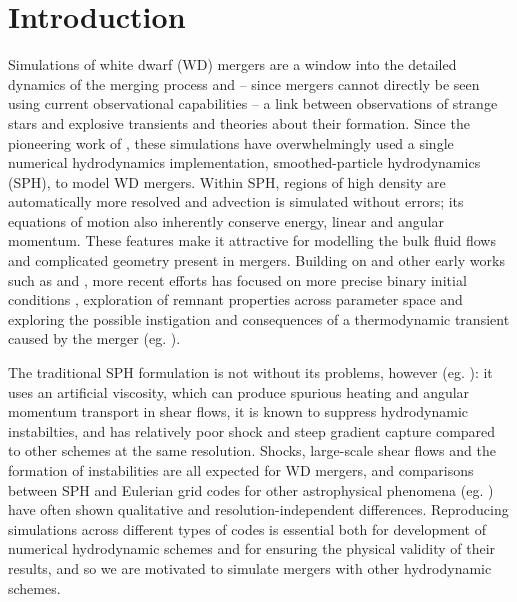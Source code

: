 \section{Introduction}
\label{sec:c3_intro}


Simulations of white dwarf (WD) mergers are a window into the detailed dynamics of the merging process and -- since mergers cannot directly be seen using current observational capabilities -- a link between observations of strange stars and explosive transients and theories about their formation.  Since the pioneering work of \cite{benz+90}, these simulations have overwhelmingly used a single numerical hydrodynamics implementation, smoothed-particle hydrodynamics (SPH), to model WD mergers.  Within SPH, regions of high density are automatically more resolved and advection is simulated without errors; its equations of motion also inherently conserve energy, linear and angular momentum.  These features make it attractive for modelling the bulk fluid flows and complicated geometry present in mergers.  Building on \citeauthor{benz+90} and other early works such as \cite{segrcm97} and \cite{guerig04}, more recent efforts has focused on more precise binary initial conditions \citep{dan+11}, exploration of remnant properties across parameter space \citep{loreig09, rask+12, zhu+13, dan+14} and exploring the possible instigation and consequences of a thermodynamic transient caused by the merger (eg. \citealt{pakm+10, dan+12, pakm+13, moll+14, rask+14}).

The traditional SPH formulation is not without its problems, however (eg. \citealt{spri10,hopk15}): it uses an artificial viscosity, which can produce spurious heating and angular momentum transport in shear flows, it is known to suppress hydrodynamic instabilties, and has relatively poor shock and steep gradient capture compared to other schemes at the same resolution.  Shocks, large-scale shear flows and the formation of instabilities are all expected for WD mergers, and comparisons between SPH and Eulerian grid codes for other astrophysical phenomena (eg. \citealt{dval+06, tracsp07, mitc+09}) have often shown qualitative and resolution-independent differences.  Reproducing simulations across different types of codes is essential both for development of numerical hydrodynamic schemes and for ensuring the physical validity of their results, and so we are motivated to simulate mergers with other hydrodynamic schemes.

